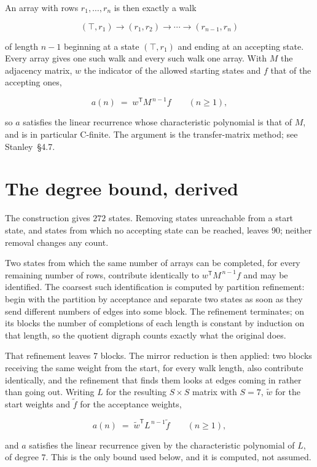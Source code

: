 \documentclass[11pt]{article}
\theoremstyle{definition}
\begin{document}
An array with rows $r_1,\dots,r_n$ is then exactly a walk

\[(\top,r_1) \to (r_1,r_2) \to \cdots \to (r_{n-1},r_n)\]

of length $n-1$ beginning at a state $(\top,r_1)$ and ending at an accepting state. Every array gives one such walk and every such walk one array. With $M$ the adjacency matrix, $w$ the indicator of the allowed starting states and $f$ that of the accepting ones,

\[a(n) \;=\; w^{\mathsf T} M^{\,n-1} f \qquad (n \ge 1),\]

so $a$ satisfies the linear recurrence whose characteristic polynomial is that of $M$, and is in particular C-finite. The argument is the transfer-matrix method; see Stanley~\S4.7.

\section{The degree bound, derived}

The construction gives $272$ states. Removing states unreachable from a start state, and states from which no accepting state can be reached, leaves $90$; neither removal changes any count.

Two states from which the same number of arrays can be completed, for every remaining number of rows, contribute identically to $w^{\mathsf T}M^{\,n-1}f$ and may be identified. The coarsest such identification is computed by partition refinement: begin with the partition by acceptance and separate two states as soon as they send different numbers of edges into some block. The refinement terminates; on its blocks the number of completions of each length is constant by induction on that length, so the quotient digraph counts exactly what the original does.

That refinement leaves $7$ blocks. The mirror reduction is then applied: two blocks receiving the same weight from the start, for every walk length, also contribute identically, and the refinement that finds them looks at edges coming in rather than going out. Writing $L$ for the resulting $S \times S$ matrix with $S = 7$, $\tilde w$ for the start weights and $\tilde f$ for the acceptance weights,

\[a(n) \;=\; \tilde w^{\mathsf T} L^{\,n-1} \tilde f \qquad (n \ge 1),\]

and $a$ satisfies the linear recurrence given by the characteristic polynomial of $L$, of degree $7$. This is the only bound used below, and it is computed, not assumed.
\end{document}
